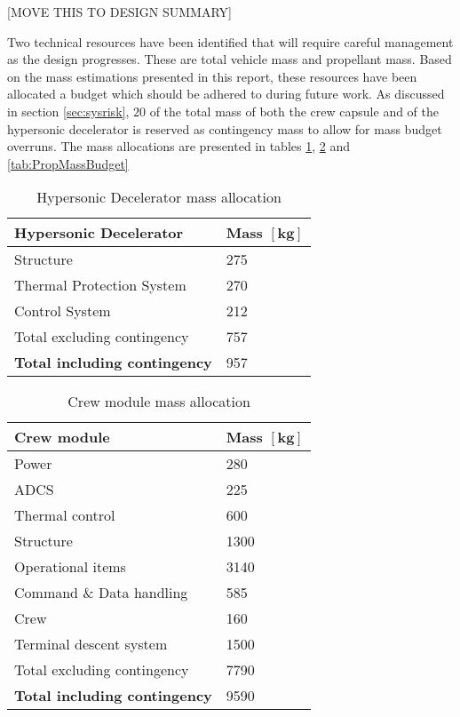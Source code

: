 [MOVE THIS TO DESIGN SUMMARY]

Two technical resources have been identified that will require careful management as the design progresses. These are total vehicle mass and propellant mass. Based on the mass estimations presented in this report, these resources have been allocated a budget which should be adhered to during future work. As discussed in section \ref{sec:sysrisk},  $20$ of the total mass of both the crew capsule and of the hypersonic decelerator is reserved as contingency mass to allow for mass budget overruns. The mass allocations are presented in tables \ref{tab:HDMassBudget},  \ref{tab:CMMassBudget} and \ref{tab:PropMassBudget} 

\begin{table}[ht]
	\centering
	\caption{Hypersonic Decelerator mass allocation}
	\label{tab:HDMassBudget}
	\begin{tabular}{|l|l|} \hline
		\textbf {Hypersonic Decelerator}             & \textbf{Mass $\mathbf{[kg]}$ } \\ \hline \hline
		Structure          &		 275       \\ \hline
		Thermal Protection System &		  270      \\ \hline
		Control System            		   &  212      \\ \hline \hline
		Total excluding contingency              	   &  757     \\ \hline
		\textbf {Total including contingency}                 &  957      \\ \hline
	\end{tabular}
\end{table}

\begin{table}[ht]
	\centering
	\caption{Crew module mass allocation}
	\label{tab:CMMassBudget}
	\begin{tabular}{|l|l|} \hline
		\textbf {Crew module}             & \textbf{Mass $\mathbf{[kg]}$ } \\ \hline \hline
		Power        &		 280       \\ \hline
		ADCS &		  225      \\ \hline
		Thermal control & 600\\ \hline
		Structure & 1300\\ \hline
		Operational items & 3140\\ \hline
		Command \& Data handling & 585 \\ \hline
		Crew & 160 \\ \hline
		Terminal descent system           		   &  1500      \\ \hline \hline
		Total excluding contingency              	   &  7790     \\ \hline
		\textbf {Total including contingency}                 &  9590      \\ \hline
	\end{tabular}
\end{table}

